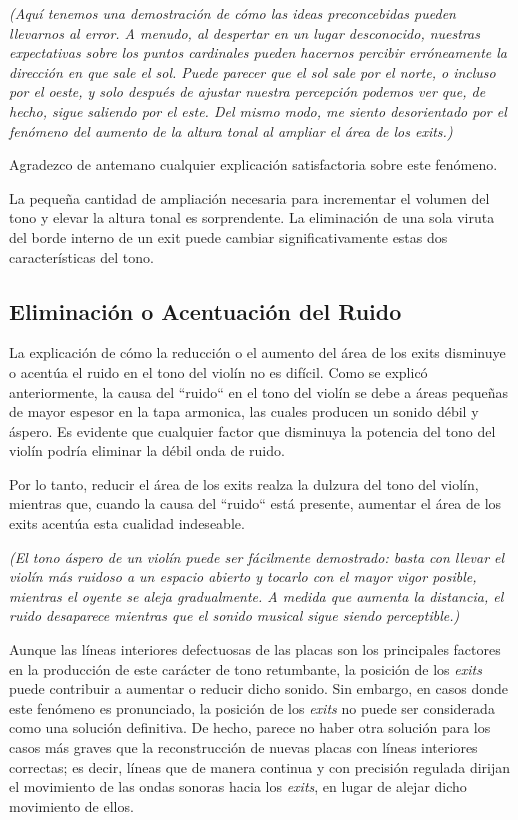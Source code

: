 \documentclass[12pt]{book}
\begin{document}
\textit{(Aquí tenemos una demostración de cómo las ideas preconcebidas pueden llevarnos al error. A menudo, al despertar en un lugar desconocido, nuestras expectativas sobre los puntos cardinales pueden hacernos percibir erróneamente la dirección en que sale el sol. Puede parecer que el sol sale por el norte, o incluso por el oeste, y solo después de ajustar nuestra percepción podemos ver que, de hecho, sigue saliendo por el este. Del mismo modo, me siento desorientado por el fenómeno del aumento de la altura tonal al ampliar el área de los exits.)}  

Agradezco de antemano cualquier explicación satisfactoria sobre este fenómeno.

La pequeña cantidad de ampliación necesaria para incrementar el volumen del tono y elevar la altura tonal es sorprendente. La eliminación de una sola viruta del borde interno de un exit puede cambiar significativamente estas dos características del tono.

\subsection*{Eliminación o Acentuación del Ruido}

La explicación de cómo la reducción o el aumento del área de los exits disminuye o acentúa el ruido en el tono del violín no es difícil. Como se explicó anteriormente, la causa del ``ruido`` en el tono del violín se debe a áreas pequeñas de mayor espesor en la tapa armonica, las cuales producen un sonido débil y áspero. Es evidente que cualquier factor que disminuya la potencia del tono del violín podría eliminar la débil onda de ruido. 

Por lo tanto, reducir el área de los exits realza la dulzura del tono del violín, mientras que, cuando la causa del ``ruido`` está presente, aumentar el área de los exits acentúa esta cualidad indeseable.

\textit{(El tono áspero de un violín puede ser fácilmente demostrado: basta con llevar el violín más ruidoso a un espacio abierto y tocarlo con el mayor vigor posible, mientras el oyente se aleja gradualmente. A medida que aumenta la distancia, el ruido desaparece mientras que el sonido musical sigue siendo perceptible.)}

Aunque las líneas interiores defectuosas de las placas son los principales factores en la producción de este carácter de tono retumbante, la posición de los \textit{exits} puede contribuir a aumentar o reducir dicho sonido. Sin embargo, en casos donde este fenómeno es pronunciado, la posición de los \textit{exits} no puede ser considerada como una solución definitiva. De hecho, parece no haber otra solución para los casos más graves que la reconstrucción de nuevas placas con líneas interiores correctas; es decir, líneas que de manera continua y con precisión regulada dirijan el movimiento de las ondas sonoras hacia los \textit{exits}, en lugar de alejar dicho movimiento de ellos.
\end{document}
